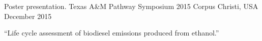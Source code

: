\begin{cventries}
\cventry
	{Poster presentation.} %
	{Texas A\&M Pathway Symposium 2015} %
	{Corpus Christi, USA} %
	{December 2015} %
	{ %
		\begin{cvitems}
			\item {“Life cycle assessment of biodiesel emissions produced from ethanol.” }
		\end{cvitems}
	}
\end{cventries}
